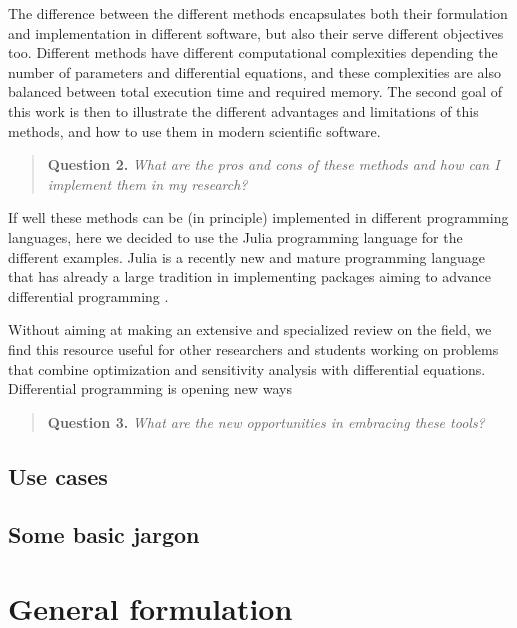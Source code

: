 The difference between the different methods encapsulates both their formulation and implementation in different software, but also their serve different objectives too. 
Different methods have different computational complexities depending the number of parameters and differential equations, and these complexities are also balanced between total execution time and required memory. 
The second goal of this work is then to illustrate the different advantages and limitations of this methods, and how to use them in modern scientific software. 
\begin{quote}
    \textbf{Question 2. }
    \textit{What are the pros and cons of these methods and how can I implement them in my research?}
\end{quote}
If well these methods can be (in principle) implemented in different programming languages, here we decided to use the Julia programming language for the different examples. 
Julia is a recently new and mature programming language that has already a large tradition in implementing packages aiming to advance differential programming \cite{Julialang_2017}. 

Without aiming at making an extensive and specialized review on the field, we find this resource useful for other researchers and students working on problems that combine optimization and sensitivity analysis with differential equations.
Differential programming is opening new ways  
\begin{quote}
    \textbf{Question 3. }
    \textit{What are the new opportunities in embracing these tools?}
\end{quote}

\subsection{Use cases}

\subsection{Some basic jargon}

\section{General formulation}


